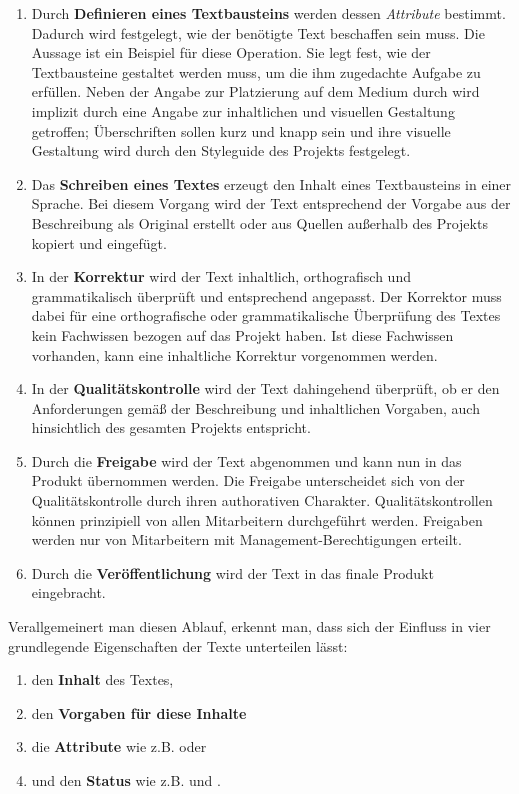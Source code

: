 \begin{enumerate}
\item Durch \textbf{Definieren eines Textbausteins} werden dessen \emph{Attribute} bestimmt. Dadurch wird festgelegt, wie der benötigte Text beschaffen sein muss. Die Aussage  ist ein Beispiel für diese Operation. Sie legt fest, wie der Textbausteine gestaltet werden muss, um die ihm zugedachte Aufgabe zu erfüllen. Neben der Angabe zur Platzierung auf dem Medium durch  wird implizit durch  eine Angabe zur inhaltlichen und visuellen Gestaltung getroffen; Überschriften sollen kurz und knapp sein und ihre visuelle Gestaltung wird durch den Styleguide des Projekts festgelegt.
\item Das \textbf{Schreiben eines Textes} erzeugt den Inhalt eines Textbausteins in einer Sprache. Bei diesem Vorgang wird der Text entsprechend der Vorgabe aus der Beschreibung als Original erstellt oder aus Quellen außerhalb des Projekts kopiert und eingefügt.
\item In der \textbf{Korrektur} wird der Text inhaltlich, orthografisch und grammatikalisch überprüft und entsprechend angepasst. Der Korrektor muss dabei für eine orthografische oder grammatikalische Überprüfung des Textes kein Fachwissen bezogen auf das Projekt haben. Ist diese Fachwissen vorhanden, kann eine inhaltliche Korrektur vorgenommen werden.
\item In der \textbf{Qualitätskontrolle} wird der Text dahingehend überprüft, ob er den Anforderungen gemäß der Beschreibung und inhaltlichen Vorgaben, auch hinsichtlich des gesamten Projekts entspricht.
\item Durch die \textbf{Freigabe} wird der Text abgenommen und kann nun in das Produkt übernommen werden. Die Freigabe unterscheidet sich von der Qualitätskontrolle durch ihren authorativen Charakter. Qualitätskontrollen können prinzipiell von allen Mitarbeitern durchgeführt werden. Freigaben werden nur von Mitarbeitern mit Management-Berechtigungen erteilt.
\item Durch die \textbf{Veröffentlichung} wird der Text in das finale Produkt eingebracht.
\end{enumerate}

\begin{samepage}
Verallgemeinert man diesen Ablauf, erkennt man, dass sich der Einfluss in vier grundlegende Eigenschaften der Texte unterteilen lässt:

\begin{enumerate}\itemsep -5pt
\item den \textbf{Inhalt} des Textes,
\item den \textbf{Vorgaben für diese Inhalte}
\item die \textbf{Attribute} wie z.B.  oder 
\item und den \textbf{Status} wie z.B.  und .
\end{enumerate}
\end{samepage}

